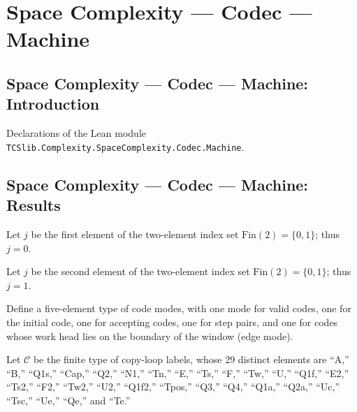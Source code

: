 \section{Space Complexity --- Codec --- Machine}
\subsection*{Space Complexity --- Codec --- Machine: Introduction}

Declarations of the Lean module \texttt{TCSlib.Complexity.SpaceComplexity.Codec.Machine}.

\subsection*{Space Complexity --- Codec --- Machine: Results}

\begin{definition}
\label{Complexity.Codec.jLen}
\leanok
Let $j$ be the first element of the two-element index set $\mathrm{Fin}(2) = \{0, 1\}$; thus $j=0$.
\end{definition}

\begin{definition}
\label{Complexity.Codec.jBit}
\leanok
Let $j$ be the second element of the two-element index set $\mathrm{Fin}(2) = \{0, 1\}$; thus $j=1$.
\end{definition}

\begin{definition}
\label{Complexity.Codec.CMode}
\leanok
Define a five-element type of code modes, with one mode for valid codes, one for the
initial code, one for accepting codes, one for step pairs, and one for codes whose work head
lies on the boundary of the window (edge mode).
\end{definition}

\begin{definition}
\label{Complexity.Codec.CpId}
\leanok
Let $\mathcal{C}$ be the finite type of copy-loop labels, whose 29 distinct elements are
“A,” “B,” “Q1s,” “Cap,” “Q2,” “N1,” “Tn,” “E,” “Ts,” “F,” “Tw,” “U,” “Q1f,” “E2,” “Ts2,” “F2,”
“Tw2,” “U2,” “Q1f2,” “Tpos,” “Q3,” “Q4,” “Q1a,” “Q2a,” “Uc,” “Tsc,” “Ue,” “Qe,” and “Te.”
\end{definition}

